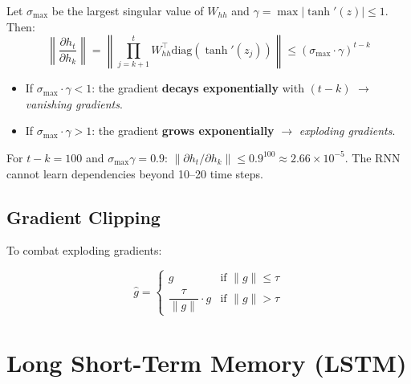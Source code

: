 \begin{theorem}
Let $\sigma_{\max}$ be the largest singular value of $W_{hh}$ and
$\gamma = \max |\tanh'(z)| \leq 1$. Then:
\begin{equation}
\left\|\frac{\partial h_t}{\partial h_k}\right\|
= \left\|\prod_{j=k+1}^{t} W_{hh}^\top \text{diag}(\tanh'(z_j))\right\|
\leq (\sigma_{\max} \cdot \gamma)^{t-k}
\label{eq:gradient-bound}
\end{equation}

\begin{itemize}
  \item If $\sigma_{\max} \cdot \gamma < 1$: the gradient
    \textbf{decays exponentially} with $(t-k)$ $\to$
    \emph{vanishing gradients}.
  \item If $\sigma_{\max} \cdot \gamma > 1$: the gradient
    \textbf{grows exponentially} $\to$ \emph{exploding gradients}.
\end{itemize}
\end{theorem}

\begin{warning}[title=\textbf{Practical consequence}]
For $t - k = 100$ and $\sigma_{\max} \gamma = 0.9$:
$\|\partial h_t / \partial h_k\| \leq 0.9^{100} \approx 2.66 \times 10^{-5}$.
The RNN cannot learn dependencies beyond 10--20 time steps.
\end{warning}

\subsection{Gradient Clipping}

To combat exploding gradients:
\begin{keyformulas}[title=\textbf{Gradient Clipping by norm}]
\begin{equation}
\hat{g} = \begin{cases}
g & \text{if } \|g\| \leq \tau \\[4pt]
\dfrac{\tau}{\|g\|} \cdot g & \text{if } \|g\| > \tau
\end{cases}
\label{eq:grad-clip}
\end{equation}
\end{keyformulas}

\section{Long Short-Term Memory (LSTM)}
\label{sec:lstm}

